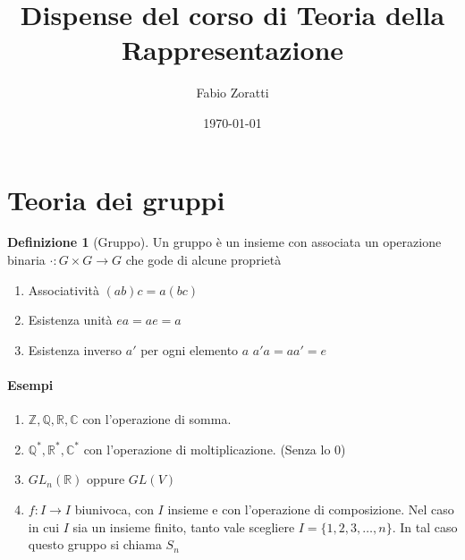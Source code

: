 \documentclass[11pt]{article}
\title{Dispense del corso di Teoria della Rappresentazione}
\author{Fabio Zoratti}
\date{\today}
\theoremstyle{plain}
\theoremstyle{definition}
\newtheorem{defn}{Definizione}[section]
\theoremstyle{remark}
\begin{document}
\maketitle





\newpage
\section{Teoria dei gruppi}

\begin{defn}[Gruppo] Un gruppo è un insieme con associata un operazione binaria $\cdot : G\times G \to G$ che gode di alcune proprietà
\begin{enumerate}
	\item Associatività \quad $(ab)c = a(bc)$
	\item Esistenza unità \quad $ea = ae = a$
	\item Esistenza inverso $a'$ per ogni elemento $a$ \quad $a' a = a a' = e$
\end{enumerate}

\end{defn}

\paragraph{Esempi}
\begin{enumerate}
	\item $\mathbb{Z}, \mathbb{Q}, \mathbb{R}, \mathbb{C}$ con l'operazione di somma.
	\item $\mathbb{Q}^*, \mathbb{R}^*, \mathbb{C}^*$ con l'operazione di moltiplicazione. (Senza lo 0)
	\item $GL_n(\mathbb{R})$ oppure $GL(V)$
	\item $f:I\to I $ biunivoca, con $I$ insieme e con l'operazione di composizione. Nel caso in cui $I$ sia un insieme finito, tanto vale scegliere $I = \{1,2,3,\ldots, n\}$. In tal caso questo gruppo si chiama $S_n$
\end{enumerate}
\end{document}
